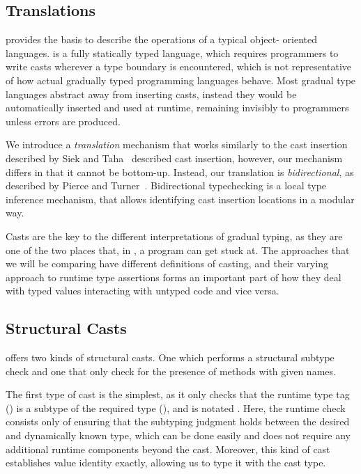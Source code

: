\documentclass[a4paper,USenglish]{tex/lipics-v2016}
\begin{document}
\subsection{Translations}

\kafka provides the basis to describe the operations of a typical object-
oriented languages.  \kafka is a fully statically typed language, which requires
programmers to write casts wherever a type boundary is encountered,  which is
not representative of how actual gradually typed programming languages behave.
Most gradual type languages abstract away from inserting casts, instead they
would be automatically inserted and used at runtime, remaining invisibly to
programmers unless errors are produced.

We introduce a \emph{translation} mechanism that works similarly to the cast insertion described 
by Siek and Taha~\cite{SiekTaha06} described cast insertion, however, our mechanism differs in
that it cannot be bottom-up. Instead, our translation is \emph{bidirectional}, as described by 
Pierce and Turner~\cite{lti-pierce}. Bidirectional typechecking is a local type 
inference mechanism, that allows identifying cast insertion locations in a modular way.

Casts are the key to the different interpretations of gradual typing, as they
are one of the two places that, in \kafka, a program can get stuck at. The
approaches that we will be comparing have different definitions of casting, and
their varying approach to runtime type assertions forms an important part of how
they deal with typed values interacting with untyped  code and vice versa.

\subsection{Structural Casts}

\kafka offers two kinds of structural casts. One which performs a structural
subtype check and one that only check for the presence of methods with given
names. 

The first type of cast is the simplest, as it only checks that the runtime type
tag (\C) is a subtype of the required type (\D), and is notated \SubCast\D\e.
Here, the runtime check consists only of ensuring that the subtyping judgment
holds between the desired and dynamically known type, which can be done easily
and does not require any additional runtime  components beyond the cast.
Moreover, this kind of cast establishes value identity exactly, allowing us to
type it with the cast type.
\end{document}

